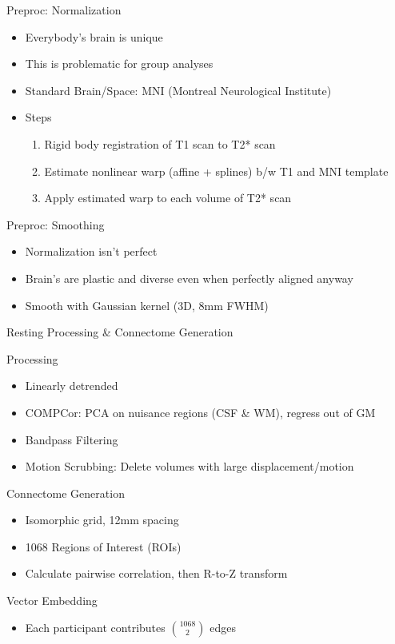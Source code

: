 \documentclass[presentation]{beamer}
\begin{document}
\begin{frame}[label={sec:orgheadline11}]{Preproc: Normalization}
\begin{itemize}
\item Everybody's brain is unique
\item This is problematic for group analyses
\item Standard Brain/Space: MNI (Montreal Neurological Institute)
\item Steps
\begin{enumerate}
\item Rigid body registration of T1 scan to T2* scan
\item Estimate nonlinear warp (affine + splines) b/w T1 and MNI template
\item Apply estimated warp to each volume of T2* scan
\end{enumerate}
\end{itemize}
\end{frame}
\begin{frame}[label={sec:orgheadline12}]{Preproc: Smoothing}
\begin{itemize}
\item Normalization isn't perfect
\item Brain's are plastic and diverse even when perfectly aligned anyway
\item Smooth with Gaussian kernel (3D, 8mm FWHM)
\end{itemize}
\end{frame}
\begin{frame}[label={sec:orgheadline13}]{Resting Processing \& Connectome Generation}
\begin{block}{Processing}
\begin{itemize}
\item Linearly detrended
\item COMPCor: PCA on nuisance regions (CSF \& WM), regress out of GM
\item Bandpass Filtering
\item Motion Scrubbing: Delete volumes with large displacement/motion
\end{itemize}
\end{block}
\begin{block}{Connectome Generation}
\begin{itemize}
\item Isomorphic grid, 12mm spacing
\item 1068 Regions of Interest (ROIs)
\item Calculate pairwise correlation, then R-to-Z transform
\end{itemize}
\end{block}
\begin{block}{Vector Embedding}
\begin{itemize}
\item Each participant contributes \({1068}\choose{2}\) edges
\end{itemize}
\end{block}
\end{frame}
\end{document}
